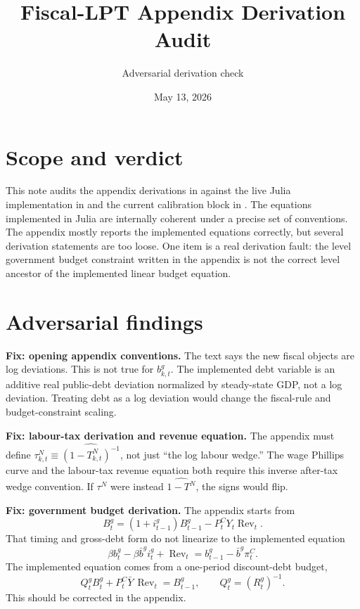 \documentclass[11pt]{article}
\title{Fiscal-LPT Appendix Derivation Audit}
\author{Adversarial derivation check}
\date{May 13, 2026}
\newcommand{\TN}{T^N}
\newcommand{\taun}{\tau^N}
\newcommand{\bg}{b^g}
\newcommand{\ig}{i^g}
\newcommand{\Rev}{\operatorname{Rev}}
\begin{document}
\maketitle

\section{Scope and verdict}

This note audits the appendix derivations in  against the
live Julia implementation in  and the
current calibration block in . The equations
implemented in Julia are internally coherent under a precise set of conventions.
The appendix mostly reports the implemented equations correctly, but several
derivation statements are too loose. One item is a real derivation fault: the
level government budget constraint written in the appendix is not the correct
level ancestor of the implemented linear budget equation.

\section{Adversarial findings}

\textbf{Fix: opening appendix conventions.}
The text says the new fiscal objects are log deviations. This is not true for
\(\bg_{k,t}\). The implemented debt variable is an additive real public-debt
deviation normalized by steady-state GDP, not a log deviation. Treating debt as
a log deviation would change the fiscal-rule and budget-constraint scaling.

\textbf{Fix: labour-tax derivation and revenue equation.}
The appendix must define \(\taun_{k,t}\equiv \widehat{(1-\TN_{k,t})^{-1}}\), not
just ``the log labour wedge.'' The wage Phillips curve and the labour-tax
revenue equation both require this inverse after-tax wedge convention. If
\(\taun\) were instead \(\widehat{1-\TN}\), the signs would flip.

\textbf{Fix: government budget derivation.}
The appendix starts from
\[
  B^g_{t}=(1+i^g_{t-1})B^g_{t-1}-P^C_tY_t\Rev_t.
\]
That timing and gross-debt form do not linearize to the implemented equation
\[
  \beta \bg_t-\beta\bar b^g\ig_t+\Rev_t=\bg_{t-1}-\bar b^g\pi^C_t.
\]
The implemented equation comes from a one-period discount-debt budget,
\[
  Q^g_tB^g_t + P^C_t\bar Y\,\Rev_t = B^g_{t-1},
  \qquad Q^g_t=(R^g_t)^{-1}.
\]
This should be corrected in the appendix.
\end{document}
